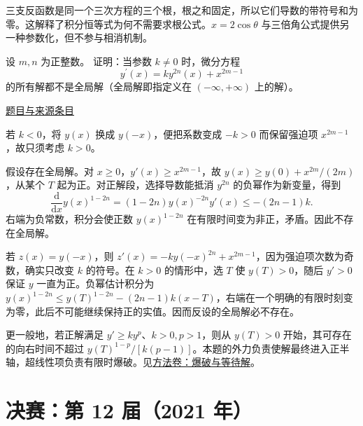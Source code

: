 \documentclass[UTF8,12pt,a4paper,fontset=fandol]{ctexart}
\begin{document}
\begin{remark}[方法与条件]三支反函数是同一个三次方程的三个根，根之和固定，所以它们导数的带符号和为零。这解释了积分恒等式为何不需要求根公式。$x=2\cos\theta$ 与三倍角公式提供另一种参数化，但不参与相消机制。\end{remark}

\begin{example}\label{ex:fin11-low:9}\label{pr:fin11-low:9}

设 $m, n$ 为正整数。 证明：当参数 $k \neq 0$ 时，微分方程
\[
y^{\prime}(x) = ky^{2n}(x) + x^{2m-1}
\]
的所有解都不是全局解（全局解即指定义在 $(-\infty,+\infty)$ 上的解）。

\par\href{https://github.com/lzxcr/cmc-mathematics/blob/64916fa1fdbc3e444a652eca204d5669058ee321/src/problems/finals/11/10.md}{题目与来源条目}

\end{example}

\begin{solve}\label{ans:fin11-low:9}

若 $k<0$，将 $y(x)$ 换成 $y(-x)$，便把系数变成 $-k>0$ 而保留强迫项 $x^{2m-1}$，故只须考虑 $k>0$。

假设存在全局解。对 $x\geq0$，$y'(x)\geq x^{2m-1}$，故 $y(x)\geq y(0)+x^{2m}/(2m)$，从某个 $T$ 起为正。对正解段，选择导数能抵消 $y^{2n}$ 的负幂作为新变量，得到
\[
\frac{\mathrm d}{\mathrm dx}y(x)^{1-2n}=(1-2n)y(x)^{-2n}y'(x)\leq-(2n-1)k.
\]
右端为负常数，积分会使正数 $y(x)^{1-2n}$ 在有限时间变为非正，矛盾。因此不存在全局解。

若 $z(x)=y(-x)$，则 $z'(x)=-ky(-x)^{2n}+x^{2m-1}$，因为强迫项次数为奇数，确实只改变 $k$ 的符号。在 $k>0$ 的情形中，选 $T$ 使 $y(T)>0$，随后 $y'>0$ 保证 $y$ 一直为正。负幂估计积分为 $y(x)^{1-2n}\le y(T)^{1-2n}-(2n-1)k(x-T)$，右端在一个明确的有限时刻变为零，此后不可能继续保持正的实值。因而反设的全局解必不存在。

\end{solve}

\begin{remark}[方法与条件]更一般地，若正解满足 $y'\geq ky^p$、$k>0,p>1$，则从 $y(T)>0$ 开始，其可存在的向右时间不超过 $y(T)^{1-p}/[k(p-1)]$。本题的外力负责使解最终进入正半轴，超线性项负责有限时爆破。见\hyperref[app:dynamics-blowup]{方法卷：爆破与等待解}。\end{remark}

\section{决赛：第 12 届（2021 年）}
\end{document}
